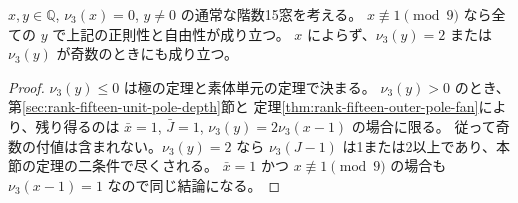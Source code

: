 \begin{corollary}
$x,y\in\mathbb Q$, $\nu_3(x)=0$, $y\ne0$ の通常な階数15窓を考える。
$x\not\equiv1\pmod9$ なら全ての $y$ で上記の正則性と自由性が成り立つ。
$x$ によらず、$\nu_3(y)=2$ または $\nu_3(y)$ が奇数のときにも成り立つ。
\end{corollary}
\begin{proof}
$\nu_3(y)\le0$ は極の定理と素体単元の定理で決まる。
$\nu_3(y)>0$ のとき、第\ref{sec:rank-fifteen-unit-pole-depth}節と
定理\ref{thm:rank-fifteen-outer-pole-fan}により、残り得るのは
$\bar x=1$, $\bar J=1$, $\nu_3(y)=2\nu_3(x-1)$ の場合に限る。
従って奇数の付値は含まれない。$\nu_3(y)=2$ なら
$\nu_3(J-1)$ は1または2以上であり、本節の定理の二条件で尽くされる。
$\bar x=1$ かつ $x\not\equiv1\pmod9$ の場合も $\nu_3(x-1)=1$ なので同じ結論になる。
\end{proof}
